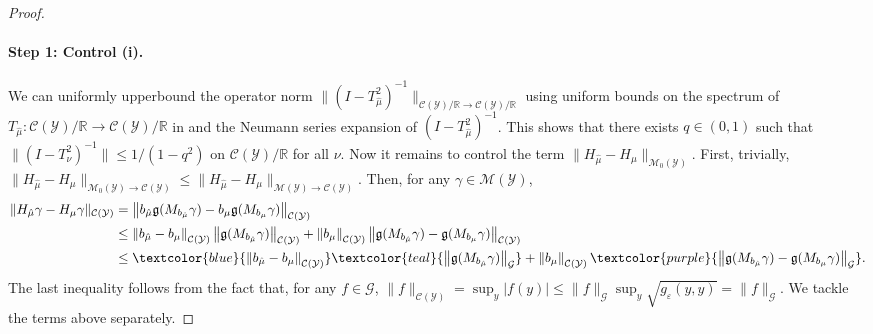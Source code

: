 \documentclass{article}
\theoremstyle{plain}
\theoremstyle{definition}
\theoremstyle{remark}
\newcommand{\R}{\mathbb{R}}
\newcommand{\cG}{\mathcal{G}}
\newcommand{\cC}{\mathcal{C}}
\newcommand{\cM}{\mathcal{M}}
\newcommand{\cY}{\mathcal{Y}}
\newcommand{\1}{\mathbbm{1}}
\newcommand{\eps}{\varepsilon}
\newcommand{\norm}[1]{\left \| #1 \right \|}
\theoremstyle{plain}
\theoremstyle{definition}
\begin{document}
\begin{proof}
    \paragraph{Step 1: Control (i).} We can uniformly upperbound the operator norm $\|{(I - T_{\hat{\mu}}^2)^{-1}}\|_{\cC(\cY) / \R \to \cC(\cY) / \R}$ using uniform bounds on the spectrum of $T_{\hat{\mu}}: \cC(\cY) / \R \to \cC(\cY) / \R$ in \citet[Prop.~3.7]{lavenant2024riemannian} and the Neumann series expansion of $(I - T_{\hat\mu}^2)^{-1}$. This shows that there exists $q \in (0,1)$ such that $\|(I - T_\nu^2)^{-1}\| \leq 1 / (1 - q^2)$ on $\cC(\cY) / \R$ for all $\nu$. 
    Now it remains to control the term $\|H_{\hat{\mu}} - H_\mu\|_{\cM_0(\cY)}$. First, trivially, $\|H_{\hat{\mu}} - H_\mu\|_{\cM_0(\cY)  \to \cC(\cY)} \leq \|H_{\hat{\mu}} - H_\mu\|_{\cM(\cY)  \to \cC(\cY)}$. Then, for any $\gamma \in \cM(\cY)$,
    \begin{align*}
        \|H_{\hat{\mu}}\gamma - H_\mu \gamma\|_{\cC(\cY)} &= \norm{b_{\hat{\mu}} \mathfrak{g}(M_{b_{\hat{\mu}}} \gamma) - b_{{\mu}} \mathfrak{g}(M_{b_{{\mu}}} \gamma)}_{\cC(\cY)}\\
        &\le \norm{b_{\hat{\mu}} - b_{{\mu}} }_{\cC(\cY)} \norm{\mathfrak{g}(M_{b_{\hat{\mu}}} \gamma)}_{\cC(\cY)} + \norm{b_{{\mu}} }_{\cC(\cY)} \norm{\mathfrak{g}(M_{b_{\hat{\mu}}} \gamma) - \mathfrak{g}(M_{b_{{\mu}}} \gamma)}_{\cC(\cY)}\\
        &\leq \textcolor{blue}{\norm{b_{\hat{\mu}} - b_{{\mu}} }_{\cC(\cY)}} \textcolor{teal}{\norm{\mathfrak{g}(M_{b_{\hat{\mu}}} \gamma)}_{\cG}} + \norm{b_{{\mu}} }_{\cC(\cY)} \textcolor{purple}{\norm{\mathfrak{g}(M_{b_{\hat{\mu}}} \gamma) - \mathfrak{g}(M_{b_{{\mu}}} \gamma)}_{\cG}}.
    \end{align*}
    The last inequality follows from the fact that, for any $f \in \cG$, $\|f\|_{\cC(\cY)} = \sup_{y} |f(y)| \leq \|f\|_{\cG} \sup_{y} \sqrt{g_\eps(y,y)} = \|f\|_{\cG}$. We tackle the terms above separately. 


\end{proof}
\end{document}
